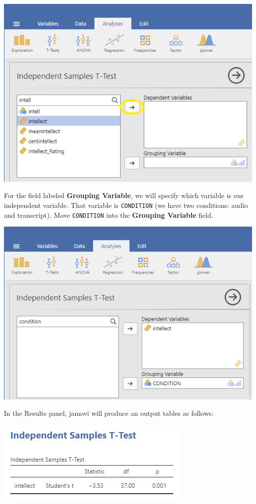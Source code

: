 \documentclass[
]{book}
\begin{document}
\includegraphics{img/MovingDVInIndependTTest.png}

For the field labeled \textbf{Grouping Variable}, we will specify which variable is our independent variable. That variable is \texttt{CONDITION} (we have two conditions: audio and transcript). Move \texttt{CONDITION} into the \textbf{Grouping Variable} field.

\includegraphics{img/MovingIVInIndependTTest.png}

In the Results panel, jamovi will produce an output tables as follows:

\includegraphics{img/IndependTTestResults.png}
\end{document}
